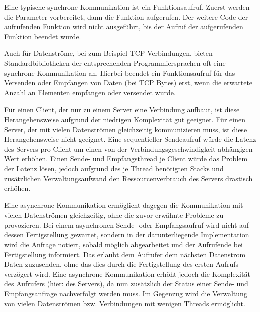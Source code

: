 Eine typische synchrone Kommunikation ist ein Funktionsaufruf.
Zuerst werden die Parameter vorbereitet, dann die Funktion aufgerufen.
Der weitere Code der aufrufenden Funktion wird nicht ausgeführt, bis der Aufruf der aufgerufenden Funktion beendet wurde.

Auch für Datenströme, bei zum Beispiel TCP-Verbindungen, bieten Standardbibliotheken der entsprechenden Programmiersprachen oft eine synchrone Kommunikation an.
Hierbei beendet ein Funktionsaufruf für das Versenden oder Empfangen von Daten (bei TCP Bytes) erst, wenn die erwartete Anzahl an Elementen empfangen oder versendet wurde.

Für einen Client, der nur zu einem Server eine Verbindung aufbaut, ist diese Herangehensweise aufgrund der niedrigen Komplexität gut geeignet.
Für einen Server, der mit vielen Datenströmen gleichzeitig kommunizieren muss, ist diese Herangehensweise nicht geeignet.
Eine sequentieller Sendeaufruf würde die Latenz des Servers pro Client um einen von der Verbindungsgeschwindigkeit abhängigen Wert erhöhen.
Einen Sende- und Empfangsthread je Client würde das Problem der Latenz lösen, jedoch aufgrund des je Thread benötigten Stacks und zusätzlichen Verwaltungsaufwand den Ressourcenverbrauch des Servers drastisch erhöhen.

Eine asynchrone Kommunikation ermöglicht dagegen die Kommunikation mit vielen Datenströmen gleichzeitig, ohne die zuvor erwähnte Probleme zu provozieren.
Bei einem asynchronen Sende- oder Empfangsaufruf wird nicht auf dessen Fertigstellung gewartet, sondern in der darunterliegende Implementation wird die Anfrage notiert, sobald möglich abgearbeitet und der Aufrufende bei Fertigstellung informiert.
Das erlaubt dem Aufrufer dem nächsten Datenstrom Daten zuzusenden, ohne das dies durch die Fertigstellung des ersten Aufrufs verzögert wird.
Eine asynchrone Kommunikation erhöht jedoch die Komplexität des Aufrufers (hier: des Servers), da nun zusätzlich der Status einer Sende- und Empfangsanfrage nachverfolgt werden muss.
Im Gegenzug wird die Verwaltung von vielen Datenströmen bzw. Verbindungen mit wenigen Threads ermöglicht.


